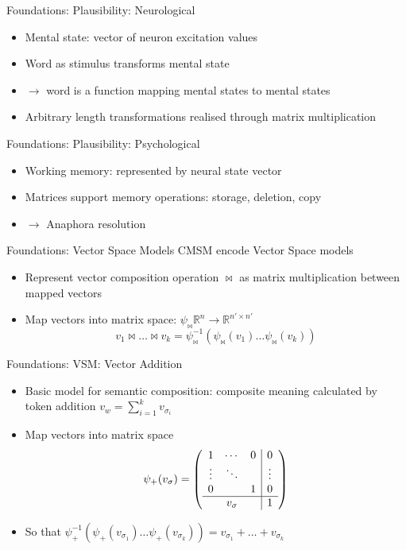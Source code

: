 \documentclass[12pt,a4paper]{beamer}
\begin{document}
\begin{frame}{Foundations: Plausibility: Neurological}
\begin{itemize}
\item Mental state: vector of neuron excitation values
\item Word as stimulus transforms mental state
\item $\to$ word is a function mapping mental states to mental states
\item Arbitrary length transformations realised through matrix multiplication
\end{itemize}
\end{frame}

\begin{frame}{Foundations: Plausibility: Psychological}
\begin{itemize}
\item Working memory: represented by neural state vector %
\item Matrices support memory operations: storage, deletion, copy
\item $\to$ Anaphora resolution
\end{itemize}
\end{frame}

\begin{frame}{Foundations: Vector Space Models}
CMSM encode Vector Space models
\begin{itemize}
\item Represent vector composition operation $\bowtie$ as matrix multiplication between mapped vectors
\item Map vectors into matrix space: $\psi_{\bowtie} \mathbb{R}^{n} \to \mathbb{R}^{n'\times n'} $
$$ v_{1} \bowtie \ldots \bowtie v_{k} = \psi_{\bowtie}^{-1}(\psi_{\bowtie}(v_{1}) \ldots \psi_{\bowtie}(v_{k}) )$$
\end{itemize}
\end{frame}


\begin{frame}{Foundations: VSM: Vector Addition}
\begin{itemize}
\item Basic model for semantic composition: composite meaning calculated by token addition $v_{w} = \sum_{i=1}^{k}v_{\sigma_{i}}$
\item Map vectors into matrix space
$$  \psi_{+}(v_{\sigma}) =
\left( \begin{array}{ccc|c}
1 & \cdots & 0 & 0 \\
\vdots & \ddots & & \vdots \\
0 &  & 1 & 0 \\ \hline
&  v_{\sigma} & & 1 \end{array} \right) $$
\item So that $\psi_{+}^{-1} (\psi_{+}(v_{\sigma_{1}}) \ldots \psi_{+}(v_{\sigma_{k}})) = v_{\sigma_{1}} + \ldots + v_{\sigma_{k}}$
\end{itemize}
\end{frame}
\end{document}
